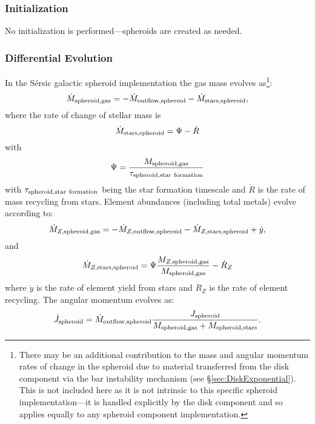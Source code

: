 \subsubsection{Initialization}

No initialization is performed---spheroids are created as needed.

\subsubsection{Differential Evolution}

In the S\'ersic galactic spheroid implementation the gas mass evolves as\footnote{There may be an additional contribution to the mass and angular momentum rates of change in the spheroid due to material transferred from the disk component via the bar instability mechanism (see \S\protect\ref{sec:DiskExponential}). This is not included here as it is not intrinsic to this specific spheroid implementation---it is handled explicitly by the disk component and so applies equally to any spheroid component implementation.}:
\begin{equation}
 \dot{M}_{\rm spheroid, gas} = - \dot{M}_{\rm outflow, spheroid} - \dot{M}_{\rm stars, spheroid},
\end{equation}
where the rate of change of stellar mass is
\begin{equation}
 \dot{M}_{\rm stars, spheroid} = \Psi - \dot{R}
\end{equation}
with
\begin{equation}
 \Psi = {M_{\rm spheroid, gas} \over \tau_{\rm spheroid, star~formation}}
\end{equation}
with $\tau_{\rm spheroid, star~formation}$ being the star formation timescale and $\dot{R}$ is the rate of mass recycling from stars.
Element abundances (including total metals) evolve according to:
\begin{equation}
  \dot{M}_{Z, {\rm spheroid, gas}} = - \dot{M}_{Z, {\rm outflow, spheroid}} - \dot{M}_{Z, {\rm stars, spheroid}} + \dot{y},
\end{equation}
and
\begin{equation}
 \dot{M}_{Z, {\rm stars, spheroid}} = \Psi {M_{Z, {\rm spheroid, gas}} \over M_{\rm spheroid, gas}} - \dot{R}_Z
\end{equation}
where $\dot{y}$ is the rate of element yield from stars and $\dot{R}_Z$ is the rate of element recycling. The angular momentum evolves as:
\begin{equation}
 \dot{J}_{\rm spheroid} = \dot{M}_{\rm outflow, spheroid} {J_{\rm spheroid} \over M_{\rm spheroid, gas} + M_{\rm spheroid, stars}}.
\end{equation}
